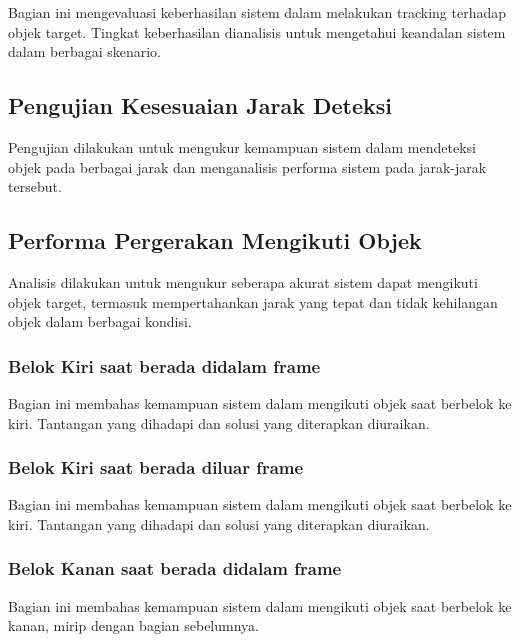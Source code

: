 Bagian ini mengevaluasi keberhasilan sistem dalam melakukan tracking terhadap objek target. Tingkat keberhasilan dianalisis untuk mengetahui keandalan sistem dalam berbagai skenario.

\subsection{Pengujian Kesesuaian Jarak Deteksi}
\label{subsec:pengujiankesesuaianjarakdeteksi}

Pengujian dilakukan untuk mengukur kemampuan sistem dalam mendeteksi objek pada berbagai jarak  dan menganalisis performa sistem pada jarak-jarak tersebut.

\subsection{Performa Pergerakan Mengikuti Objek}
\label{subsec:performaakurasiobjek}

Analisis dilakukan untuk mengukur seberapa akurat sistem dapat mengikuti objek target, termasuk mempertahankan jarak yang tepat dan tidak kehilangan objek dalam berbagai kondisi.

\subsubsection{Belok Kiri saat berada didalam frame}
\label{subsubsec:belokkiridalamframe}

Bagian ini membahas kemampuan sistem dalam mengikuti objek saat berbelok ke kiri. Tantangan yang dihadapi dan solusi yang diterapkan diuraikan.

\subsubsection{Belok Kiri saat berada diluar frame}
\label{subsubsec:belokkiriluarframe}

Bagian ini membahas kemampuan sistem dalam mengikuti objek saat berbelok ke kiri. Tantangan yang dihadapi dan solusi yang diterapkan diuraikan.

\subsubsection{Belok Kanan saat berada didalam frame}
\label{subsubsec:belokkanandalamframe}

Bagian ini membahas kemampuan sistem dalam mengikuti objek saat berbelok ke kanan, mirip dengan bagian sebelumnya.

